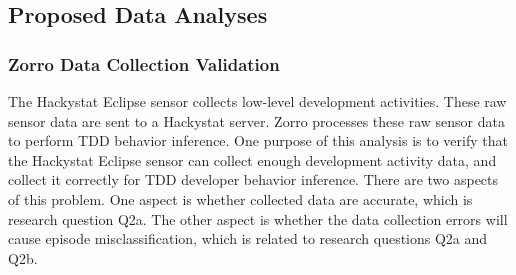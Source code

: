 \subsection{Proposed Data Analyses}
\subsubsection{Zorro Data Collection Validation}
The Hackystat Eclipse sensor collects low-level development activities.
These raw sensor data are sent to a Hackystat server. Zorro processes
these raw sensor data to perform TDD behavior inference. One purpose
of this analysis is to verify that the Hackystat Eclipse sensor can
collect enough development activity data, and collect it correctly for
TDD developer behavior inference.  There are two aspects of this
problem. One aspect is whether collected data are accurate, which
is research question Q2a. The other aspect is whether the data
collection errors will cause episode misclassification, which is
related to research questions Q2a and Q2b.

